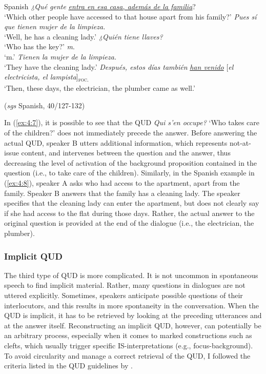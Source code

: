 \ea \label{ex:4:8} Spanish
\ea \textit{¿Qué gente} \uline{\textit{entra en esa casa, además de la familia}}?\\
`Which other people have accessed to that house apart from his family?'
\ex \textit{Pues sí que tienen mujer de la limpieza.}\\
`Well, he has a cleaning lady.'
 \textit{¿Quién tiene llaves?}\\
`Who has the key?'
 \textit{m}.\\  
`m.'
 \textit{Tienen la mujer de la limpieza.}\\ 
`They have the cleaning lady.'
 \textit{Después, estos días también} \uline{\textit{han venido}} {[\textit{el electricista, el lampista}]\textsubscript{\textsc{foc.}}}\normalsize\\
‘Then, these days, the electrician, the plumber came as well.' 

\hfill (\textit{sgs} Spanish, 40/127-132)   
\z \z 

 In (\ref{ex:4:7}), it is possible to see that the QUD \textit{Qui s'en occupe?} `Who takes care of the children?' does not immediately precede the answer. Before answering the actual QUD, speaker B utters additional information, which represents not-at-issue content, and intervenes between the question and the answer, thus decreasing the level of activation of the background proposition contained in the question (i.e., to take care of the children). Similarly, in the Spanish example in (\ref{ex:4:8}), speaker A asks who had access to the apartment, apart from the family. Speaker B answers that the family has a cleaning lady. The speaker specifies that the cleaning lady can enter the apartment, but does not clearly say if she had access to the flat during those days. Rather, the actual answer to the original question is provided at the end of the dialogue (i.e., the electrician, the plumber).

 \subsubsection{Implicit QUD}
 \largerpage[2]
 The third type of QUD is more complicated. It is not uncommon in spontaneous speech to find implicit material. Rather, many questions in dialogues are not uttered explicitly. Sometimes, speakers anticipate possible questions of their interlocutors, and this results in more spontaneity in the conversation. When the QUD is implicit, it has to be retrieved by looking at the preceding utterances and at the answer itself.
Reconstructing an implicit QUD, however, can potentially be an arbitrary process, especially when it comes to marked constructions such as clefts, which usually trigger specific IS-interpretations (e.g., focus-background). To avoid circularity and manage a correct retrieval of the QUD, I followed the criteria listed in the QUD guidelines by \textcite{riester2018annotation, riester2019constructing}.

